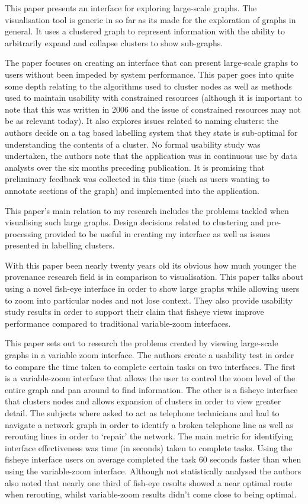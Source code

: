 This paper presents an interface for exploring large-scale graphs. The visualisation tool is generic in so far as its made for the exploration of graphs in general. It uses a clustered graph to represent information with the ability to arbitrarily expand and collapse clusters to show sub-graphs.

The paper focuses on creating an interface that can present large-scale graphs to users without been impeded by system performance. This paper goes into quite some depth relating to the algorithms used to cluster nodes as well as methods used to maintain usability with constrained resources (although it is important to note that this was written in 2006 and the issue of constrained resources may not be as relevant today). It also explores issues related to naming clusters: the authors decide on a tag based labelling system that they state is sub-optimal for understanding the contents of a cluster. No formal usability study was undertaken, the authors note that the application was in continuous use by data analysts over the six months preceding publication. It is promising that preliminary feedback was collected in this time (such as users wanting to annotate sections of the graph) and implemented into the application.

This paper's main relation to my research includes the problems tackled when visualising such large graphs. Design decisions related to clustering and pre-processing provided to be useful in creating my interface as well as issues presented in labelling clusters. 

With this paper been nearly twenty years old its obvious how much younger the provenance research field is in comparison to visualisation. This paper talks about using a novel fish-eye interface in order to show large graphs while allowing users to zoom into particular nodes and not lose context. They also provide usability study results in order to support their claim that fisheye views improve performance compared to traditional variable-zoom interfaces.

This paper sets out to research the problems created by viewing large-scale graphs in a variable zoom interface. The authors create a usability test in order to compare the time taken to complete certain tasks on two interfaces. The first is a variable-zoom interface that allows the user to control the zoom level of the entire graph and pan around to find information. The other is a fisheye interface that clusters nodes and allows expansion of clusters in order to view greater detail. The subjects where asked to act as telephone technicians and had to navigate a network graph in order to identify a broken telephone line as well as rerouting lines in order to `repair' the network. The main metric for identifying interface effectiveness was time (in seconds) taken to complete tasks. Using the fisheye interface users on average completed the task 60 seconds faster than when using the variable-zoom interface. Although not statistically analysed the authors also noted that nearly one third of fish-eye results showed a near optimal route when rerouting, whilst variable-zoom results didn't come close to being optimal.

